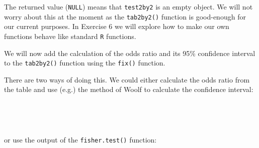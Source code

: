 \documentclass[12pt,a4paper]{book}
\newenvironment{Shaded}{\begin{snugshade}}{\end{snugshade}}
\newcommand{\KeywordTok}[1]{\textcolor[rgb]{0.13,0.29,0.53}{\textbf{#1}}}
\newcommand{\DecValTok}[1]{\textcolor[rgb]{0.00,0.00,0.81}{#1}}
\newcommand{\FloatTok}[1]{\textcolor[rgb]{0.00,0.00,0.81}{#1}}
\newcommand{\CharTok}[1]{\textcolor[rgb]{0.31,0.60,0.02}{#1}}
\newcommand{\StringTok}[1]{\textcolor[rgb]{0.31,0.60,0.02}{#1}}
\newcommand{\OperatorTok}[1]{\textcolor[rgb]{0.81,0.36,0.00}{\textbf{#1}}}
\newcommand{\NormalTok}[1]{#1}
\theoremstyle{definition}
\theoremstyle{definition}
\theoremstyle{definition}
\theoremstyle{remark}
\begin{document}
\newpage

The returned value (\texttt{NULL}) means that \texttt{test2by2} is an
empty object. We will not worry about this at the moment as the
\texttt{tab2by2()} function is good-enough for our current purposes. In
Exercise 6 we will explore how to make our own functions behave like
standard \texttt{R} functions.

We will now add the calculation of the odds ratio and its 95\%
confidence interval to the \texttt{tab2by2()} function using the
\texttt{fix()} function.

There are two ways of doing this. We could either calculate the odds
ratio from the table and use (e.g.) the method of Woolf to calculate the
confidence interval:

~

\begin{Shaded}
\end{Shaded}

~

or use the output of the \texttt{fisher.test()} function:

~

\begin{Shaded}
\end{Shaded}
\end{document}

